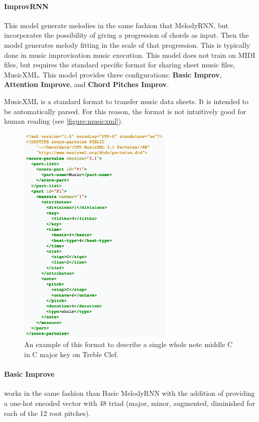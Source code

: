 \paragraph{ImprovRNN} This model generate melodies in the same fashion that MelodyRNN, but
incorporates the possibility of giving a progression of chords as input. Then the model
generates melody fitting in the scale of that progression. This is typically done in music
improvisation music execution. This model does not train on MIDI files, but requires the
standard specific format for sharing sheet music files, MusicXML. This
model provides three configurations: \textbf{Basic Improv}, \textbf{Attention Improve},
and \textbf{Chord Pitches Improv}.

MusicXML is a standard format to transfer music data sheets. It is intended to be
automatically parsed. For this reason, the format is not intuitively good for human
reading (see \autoref{figure:musicxml}).

\begin{figure}[ht!]
  \centering
  \includegraphics[width=0.5 \linewidth]{image/fig_JDF29.png}
  \caption{An example of this format to describe a single whole note middle C in C major key
    on Treble Clef.}
  \label{figure:musicxml}
\end{figure}

\paragraph{Basic Improve} works in the same fashion than Basic MelodyRNN with the addition of
providing a one-hot encoded vector with 48 triad (major, minor, augmented, diminished for
each of the 12 root pitches).

